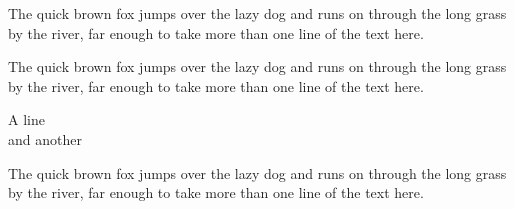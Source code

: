 \documentclass{article}
\begin{document}
The quick brown fox jumps over the lazy dog and runs on through the long grass by the river, far enough to take more than one line of the text here.

\centering
The quick brown fox jumps over the lazy dog and runs on through the long grass by the river, far enough to take more than one line of the text here.

\large A line\\ and another

The quick brown fox jumps over the lazy dog and runs on through the long grass by the river, far enough to take more than one line of the text here.
\end{document}
